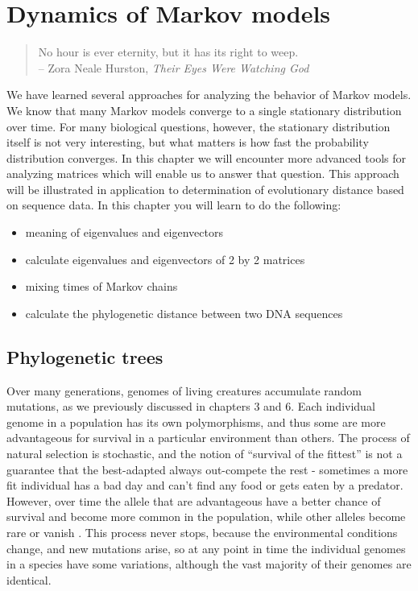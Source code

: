 \documentclass[
  letterpaper,
  DIV=11,
  numbers=noendperiod]{scrreprt}
\providecommand{\tightlist}{%
  \setlength{\itemsep}{0pt}\setlength{\parskip}{0pt}}\usepackage{longtable,booktabs,array}
\begin{document}

\hypertarget{dynamics-of-markov-models}{%
\chapter{Dynamics of Markov models}\label{dynamics-of-markov-models}}

\begin{quote}
No hour is ever eternity, but it has its right to weep.\\
-- Zora Neale Hurston, \emph{Their Eyes Were Watching God}
\end{quote}

We have learned several approaches for analyzing the behavior of Markov
models. We know that many Markov models converge to a single stationary
distribution over time. For many biological questions, however, the
stationary distribution itself is not very interesting, but what matters
is how fast the probability distribution converges. In this chapter we
will encounter more advanced tools for analyzing matrices which will
enable us to answer that question. This approach will be illustrated in
application to determination of evolutionary distance based on sequence
data. In this chapter you will learn to do the following:

\begin{itemize}
\tightlist
\item
  meaning of eigenvalues and eigenvectors
\item
  calculate eigenvalues and eigenvectors of 2 by 2 matrices
\item
  mixing times of Markov chains
\item
  calculate the phylogenetic distance between two DNA sequences
\end{itemize}

\hypertarget{phylogenetic-trees}{%
\section{Phylogenetic trees}\label{phylogenetic-trees}}

Over many generations, genomes of living creatures accumulate random
mutations, as we previously discussed in chapters 3 and 6. Each
individual genome in a population has its own polymorphisms, and thus
some are more advantageous for survival in a particular environment than
others. The process of natural selection is stochastic, and the notion
of ``survival of the fittest'' is not a guarantee that the best-adapted
always out-compete the rest - sometimes a more fit individual has a bad
day and can't find any food or gets eaten by a predator. However, over
time the allele that are advantageous have a better chance of survival
and become more common in the population, while other alleles become
rare or vanish \cite{futuyma_evolution_2009}. This process never stops,
because the environmental conditions change, and new mutations arise, so
at any point in time the individual genomes in a species have some
variations, although the vast majority of their genomes are identical.
\end{document}
